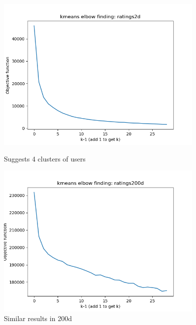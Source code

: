 \documentclass[11pt]{article}
\begin{document}
\begin{figure}[h!]
    \centering
    \begin{minipage}{0.45\textwidth}
        \centering
        \includegraphics[width=0.9\textwidth]{kmeans_elbow_2d} %
        \caption{Suggests 4 clusters of users}
    \end{minipage}\hfill
    \begin{minipage}{0.45\textwidth}
        \centering
        \includegraphics[width=0.9\textwidth]{kmeans_elbow_200d} %
        \caption{Similar results in 200d}
    \end{minipage}
\end{figure}


% 

\end{document}
